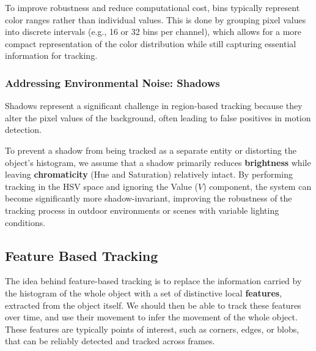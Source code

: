 \begin{center}
    \begin{minipage}{0.48\textwidth}
        \centering
        \resizebox{\linewidth}{!}{}
    \end{minipage}
    \hfill
    \begin{minipage}{0.48\textwidth}
        \centering
        \resizebox{\linewidth}{!}{}
    \end{minipage}
\end{center}

To improve robustness and reduce computational cost, bins typically represent color ranges rather than individual 
values. This is done by grouping pixel values into discrete intervals (e.g., 16 or 32 bins per channel), which allows 
for a more compact representation of the color distribution while still capturing essential information for tracking.

\subsubsection{Addressing Environmental Noise: Shadows}
Shadows represent a significant challenge in region-based tracking because 
they alter the pixel values of the background, often leading to false positives in motion detection. 

To prevent a shadow from being tracked as a separate entity or distorting the object's histogram, 
we assume that a shadow primarily reduces \textbf{brightness} while leaving \textbf{chromaticity} (Hue and Saturation) relatively intact. 
By performing tracking in the HSV space and ignoring the Value ($V$) component, 
the system can become significantly more shadow-invariant, improving the robustness of the tracking process in outdoor 
environments or scenes with variable lighting conditions.

\subsection{Feature Based Tracking}
The idea behind feature-based tracking is to replace the information carried by the histogram of the whole object 
with a set of distinctive local \textbf{features}, extracted from the object itself. We should then be able to track these features
over time, and use their movement to infer the movement of the whole object.
These features are typically points of interest, such as corners, edges, or blobs, that can be reliably detected and tracked across frames.

